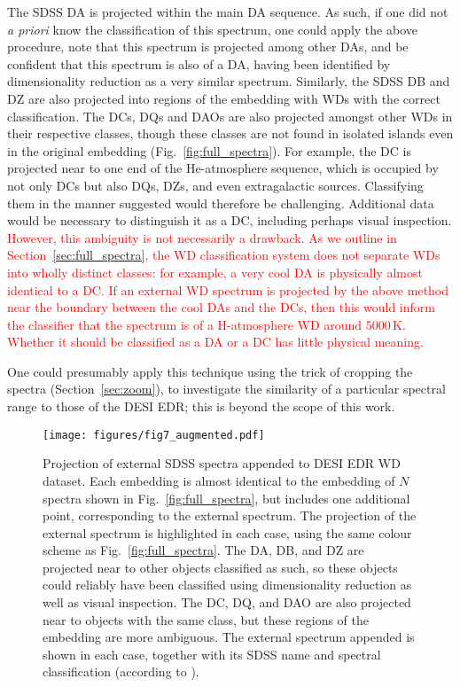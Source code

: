 \documentclass[fleqn,usenatbib]{mnras}
\newcommand{\red}[1]{\textcolor{red}{#1}}
\begin{document}
The SDSS DA is projected within the main DA sequence.
As such, if one did not \textit{a priori} know the classification of this spectrum, one could apply the above procedure, note that this spectrum is projected among other DAs, and be confident that this spectrum is also of a DA, having been identified by dimensionality reduction as a very similar spectrum.
Similarly, the SDSS DB and DZ are also projected into regions of the embedding with WDs with the correct classification.
The DCs, DQs and DAOs are also projected amongst other WDs in their respective classes, though these classes are not found in isolated islands even in the original embedding (Fig.~\ref{fig:full_spectra}).
For example, the DC is projected near to one end of the He-atmosphere sequence, which is occupied by not only DCs but also DQs, DZs, and even extragalactic sources.
Classifying them in the manner suggested would therefore be challenging.
Additional data would be necessary to distinguish it as a DC, including perhaps visual inspection.
\red{
However, this ambiguity is not necessarily a drawback.
As we outline in Section~\ref{sec:full_spectra}, the WD classification system does not separate WDs into wholly distinct classes: for example, a very cool DA is physically almost identical to a DC.
If an external WD spectrum is projected by the above method near the boundary between the cool DAs and the DCs, then this would inform the classifier that the spectrum is of a H-atmosphere WD around $5000\,\text{K}$.
Whether it should be classified as a DA or a DC has little physical meaning.
}

One could presumably apply this technique using the trick of cropping the spectra (Section~\ref{sec:zoom}), to investigate the similarity of a particular spectral range to those of the DESI EDR; this is beyond the scope of this work.

\begin{figure*}
\texttt{[image: figures/fig7\_augmented.pdf]}
\caption{
    Projection of external SDSS spectra appended to DESI EDR WD dataset.
    Each embedding is almost identical to the embedding of $N$ spectra shown in Fig.~\ref{fig:full_spectra}, but includes one additional point, corresponding to the external spectrum.
    The projection of the external spectrum is highlighted in each case, using the same colour scheme as Fig.~\ref{fig:full_spectra}.
    The DA, DB, and DZ are projected near to other objects classified as such, so these objects could reliably have been classified using dimensionality reduction as well as visual inspection.
    The DC, DQ, and DAO are also projected near to objects with the same class, but these regions of the embedding are more ambiguous.
    The external spectrum appended is shown in each case, together with its SDSS name and spectral classification (according to \citealt{gentilefusillo19}).
}
\label{fig:external_spectra}
\end{figure*}
\end{document}
